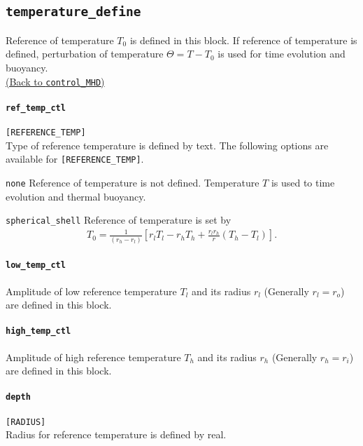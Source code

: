 \subsection{\tt temperature\_define}
\label{href_t:temperature_define}
Reference of temperature $T_{0}$ is defined in this block. If reference of temperature is defined, perturbation of temperature $\Theta = T - T_{0}$ is used for time evolution and buoyancy. \\
\hyperref[href_i:temperature_define]{(Back to {\tt control\_MHD})}

\paragraph{\tt ref\_temp\_ctl}
\label{href_t:ref_temp_ctl}
\verb|[REFERENCE_TEMP]| \\
Type of reference temperature is defined by text. The following options are available for \verb|[REFERENCE_TEMP]|.
%
\begin{description}
\item{\tt none}   Reference of temperature is not defined. Temperature $T$ is used to time evolution and thermal buoyancy.
\item{\tt spherical\_shell} Reference of temperature is set by
\begin{eqnarray}
 T_{0} = \frac{1}{\left(r_{h}-r_{l} \right)} \left[
          r_{l}T_{l} - r_{h}T_{h} + \frac{r_{l} r_{h}}{r} \left(T_{h}-T_{l}\right) \right].
\nonumber
\end{eqnarray}
\end{description}
%

\paragraph{\tt low\_temp\_ctl}
\label{href_t:low_temp_ctl}
Amplitude of low reference temperature $T_{l}$ and its radius $r_{l}$ (Generally $r_{l} = r_{o}$) are defined in this block.

\paragraph{\tt high\_temp\_ctl}
\label{href_t:high_temp_ctl}
Amplitude of high reference temperature $T_{h}$ and its radius $r_{h}$ (Generally $r_{h} = r_{i}$) are defined in this block.

\paragraph{\tt depth}
\label{href_t:depth}
\verb|[RADIUS]| \\
Radius for reference temperature is defined by real.

